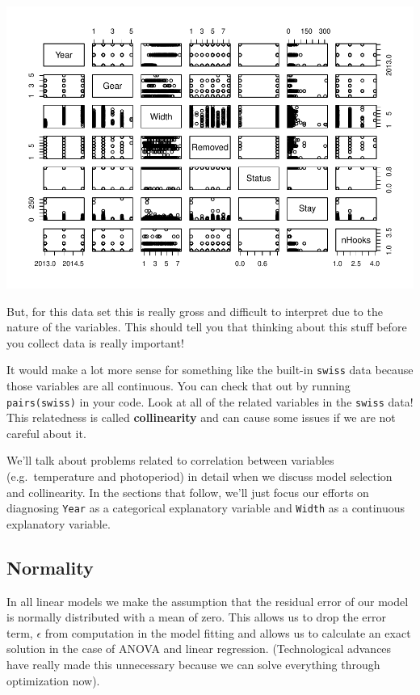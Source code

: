 \documentclass[
]{book}
\begin{document}
\includegraphics{worstr_files/figure-latex/unnamed-chunk-228-1.pdf}

But, for this data set this is really gross and difficult to interpret due to the nature of the variables. This should tell you that thinking about this stuff before you collect data is really important!

It would make a lot more sense for something like the built-in \texttt{swiss} data because those variables are all continuous. You can check that out by running \texttt{pairs(swiss)} in your code. Look at all of the related variables in the \texttt{swiss} data! This relatedness is called \textbf{collinearity} and can cause some issues if we are not careful about it.

We'll talk about problems related to correlation between variables (e.g.~temperature and photoperiod) in detail when we discuss model selection and collinearity. In the sections that follow, we'll just focus our efforts on diagnosing \texttt{Year} as a categorical explanatory variable and \texttt{Width} as a continuous explanatory variable.

\hypertarget{normality}{%
\subsection{Normality}\label{normality}}

In all linear models we make the assumption that the residual error of our model is normally distributed with a mean of zero. This allows us to drop the error term, \(\epsilon\) from computation in the model fitting and allows us to calculate an exact solution in the case of ANOVA and linear regression. (Technological advances have really made this unnecessary because we can solve everything through optimization now).
\end{document}
